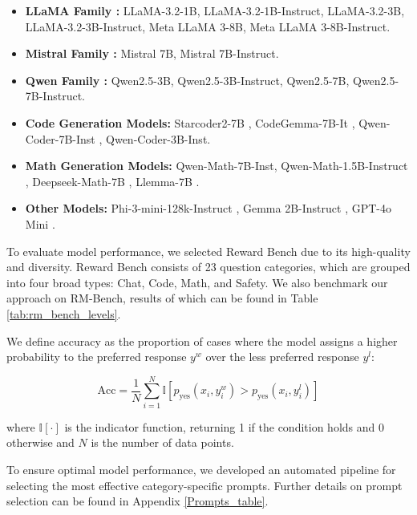 \begin{itemize}
  \setlength{\itemsep}{0.05em} %
  \item \textbf{LLaMA Family \citep{dubey2024llama}:} LLaMA-3.2-1B, LLaMA-3.2-1B-Instruct, LLaMA-3.2-3B, LLaMA-3.2-3B-Instruct, Meta LLaMA 3-8B, Meta LLaMA 3-8B-Instruct.
  \item \textbf{Mistral Family \citep{jiang2023mistral}:} Mistral 7B, Mistral 7B-Instruct.
  \item \textbf{Qwen Family \citep{yang2024qwen2}:} Qwen2.5-3B, Qwen2.5-3B-Instruct, Qwen2.5-7B, Qwen2.5-7B-Instruct.
  \item \textbf{Code Generation Models:} Starcoder2-7B \citep{lozhkov2024starcoder}, CodeGemma-7B-It \citep{team2024codegemma}, Qwen-Coder-7B-Inst \citep{hui2024qwen2}, Qwen-Coder-3B-Inst.
  \item \textbf{Math Generation Models:} Qwen-Math-7B-Inst, Qwen-Math-1.5B-Instruct \citep{yang2024qwen2}, Deepseek-Math-7B \citep{shao2024deepseekmathpushinglimitsmathematical}, Llemma-7B \citep{azerbayev2024llemmaopenlanguagemodel}.
  \item \textbf{Other Models:} Phi-3-mini-128k-Instruct \citep{abdin2024phi}, Gemma 2B-Instruct \citep{team2024gemma}, GPT-4o Mini \citep{openai2024gpt4technicalreport}.

\end{itemize}

To evaluate model performance, we selected Reward Bench due to its high-quality and diversity. Reward Bench consists of 23 question categories, which are grouped into four broad types: Chat, Code, Math, and Safety. We also benchmark our approach on RM-Bench, results of which can be found in Table \ref{tab:rm_bench_levels}.

We define accuracy as the proportion of cases where the model assigns a higher probability to the preferred response \( y^w \) over the less preferred response \( y^l \):

\[
\text{Acc} = \frac{1}{N} \sum_{i=1}^{N} \mathbb{I} \left[ p_{\text{yes}}(x_i, y^w_i) > p_{\text{yes}}(x_i, y^l_i) \right]
\]

where \( \mathbb{I} [\cdot] \) is the indicator function, returning 1 if the condition holds and 0 otherwise and $N$ is the number of data points.

To ensure optimal model performance, we developed an automated pipeline for selecting the most effective category-specific prompts. Further details on prompt selection can be found in Appendix \ref{Prompts_table}.

